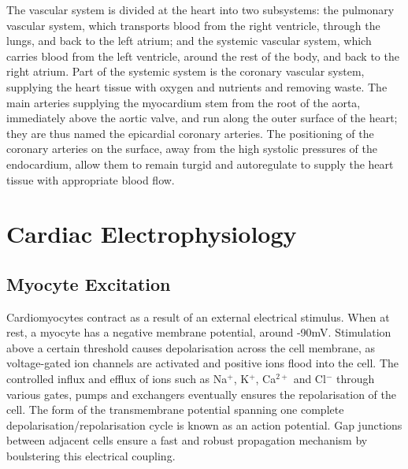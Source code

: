   The vascular system is divided at the heart into two subsystems: the pulmonary vascular system, which transports blood from the right ventricle, through the lungs, and back to the left atrium; and the systemic vascular system, which carries blood from the left ventricle, around the rest of the body, and back to the right atrium. Part of the systemic system is the coronary vascular system, supplying the heart tissue with oxygen and nutrients and removing waste. The main arteries supplying the myocardium stem from the root of the aorta, immediately above the aortic valve, and run along the outer surface of the heart; they are thus named the epicardial coronary arteries. The positioning of the coronary arteries on the surface, away from the high systolic pressures of the endocardium, allow them to remain turgid and autoregulate to supply the heart tissue with appropriate blood flow.

\section{Cardiac Electrophysiology}
\label{sec:electrophysiology}
  \subsection{Myocyte Excitation}
  \label{sub:myocyte_excitation}
    Cardiomyocytes contract as a result of an external electrical stimulus. When at rest, a myocyte has a negative membrane potential, around -90mV. Stimulation above a certain threshold causes depolarisation across the cell membrane, as voltage-gated ion channels are activated and positive ions flood into the cell. The controlled influx and efflux of ions such as Na$^+$, K$^+$, Ca$^{2+}$ and Cl$^-$ through various gates, pumps and exchangers eventually ensures the repolarisation of the cell. The form of the transmembrane potential spanning one complete depolarisation/repolarisation cycle is known as an action potential. Gap junctions between adjacent cells ensure a fast and robust propagation mechanism by boulstering this electrical coupling.
  
